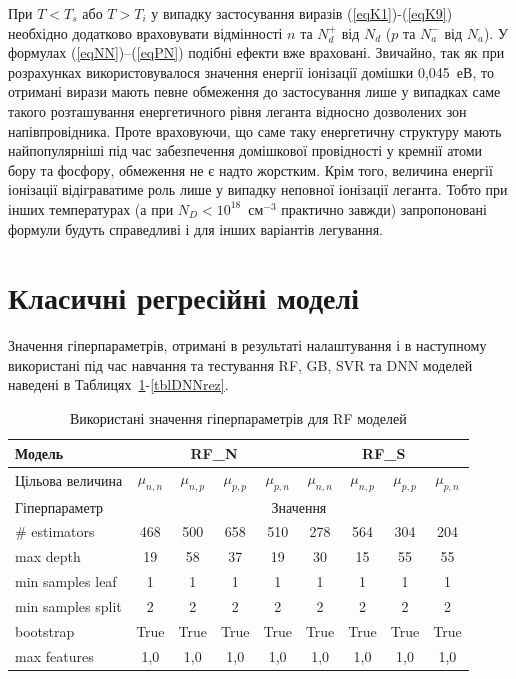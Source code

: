 \documentclass[14pt,a4paper,titlepage,oneside]{book}
\numberwithin{equation}{part}
\begin{document}
При $T<T_s$ або $T>T_i$ у випадку застосування виразів (\ref{eqK1})-(\ref{eqK9}) необхідно додатково враховувати
відмінності $n$ та $N_d^+$ від $N_d$ ($p$ та $N_a^-$ від $N_a$).
У формулах (\ref{eqNN})--(\ref{eqPN}) подібні ефекти вже враховані.
Звичайно, так як при розрахунках використовувалося значення енергії іонізації домішки 0,045~еВ, то отримані
вирази мають певне обмеження до застосування лише у випадках саме такого розташування енергетичного рівня леганта відносно дозволених зон
напівпровідника.
Проте враховуючи, що саме таку енергетичну структуру мають найпопулярніші під час забезпечення домішкової провідності у кремнії атоми бору та фосфору,
обмеження не є надто жорстким.
Крім того, величина енергії іонізації відіграватиме роль лише у випадку неповної іонізації леганта.
Тобто при інших температурах (а при $N_D<10^{18}$~см$^{-3}$ практично завжди) запропоновані формули будуть справедливі і для інших варіантів легування.


\section{Класичні регресійні моделі}

Значення гіперпараметрів, отримані в результаті налаштування і в наступному використані під час навчання та тестування RF, GB, SVR та DNN моделей
наведені в Таблицях~\ref{tblRFrez}-\ref{tblDNNrez}.

\begin{table}
\setlength{\tabcolsep}{3pt}
\caption{Використані значення гіперпараметрів для RF моделей}
\label{tblRFrez}
\centering
\begin{tabular}{|l|c|c|c|c|c|c|c|c|}
\hline
Модель& \multicolumn{4}{c|}{RF\_N}& \multicolumn{4}{c|}{RF\_S} \rule{0pt}{11pt}\\
\hline
Цільова величина&$\mu_{n,n}$&$\mu_{n,p}$&$\mu_{p,p}$&$\mu_{p,n}$&$\mu_{n,n}$&$\mu_{n,p}$&$\mu_{p,p}$&$\mu_{p,n}$\\
\hline
Гіперпараметр&\multicolumn{8}{c|}{Значення}\\
\hline
\# estimators&468&500&658&510&278&564&304&204\\
\hline
max depth&19&58&37&19&30&15&55&55\\
\hline
min samples leaf &1&1&1&1&1&1&1&1\\
\hline
min samples split	&2&2&2&2&2&2&2&2\\
\hline
bootstrap	&True&True&True&True&True&True&True&True\\
\hline
max features &1,0&1,0&1,0&1,0&1,0&1,0&1,0&1,0\\
\hline
\end{tabular}
\end{table}
\end{document}
